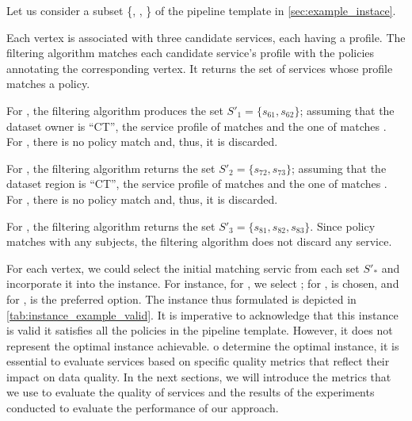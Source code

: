 \begin{example}[\bf \pipelineInstance]\label{ex:instance}

  Let us consider a subset \{, , \} of the pipeline template \tChartFunction in \cref{sec:example_instace}.

  Each vertex is associated with three candidate services, each having a profile. The filtering algorithm matches each candidate service's profile with the policies annotating the corresponding vertex. It returns the set of services whose profile matches a policy.
  \begin{enumerate*}[label=\textit{\roman*})]
    \item For , the filtering algorithm produces the set $S'_1=\{s_{61},s_{62}\}$; assuming that the dataset owner is ``CT'', the service profile of  matches  and the one of  matches .
          For , there is no policy match and, thus, it is discarded.
    \item For , the filtering algorithm returns the set $S'_2=\{s_{72},s_{73}\}$; assuming that the dataset region is ``CT'', the service profile of  matches  and the one of  matches .
          For , there is no policy match and, thus, it is discarded.
    \item For , the filtering algorithm returns the set $S'_3=\{s_{81},s_{82},s_{83}\}$. Since policy  matches with any subjects, the filtering algorithm does not discard any service.
  \end{enumerate*}

  For each vertex, we could select the initial matching servic from each set $S'_*$ and incorporate it into the instance.
  For instance, for , we select ; for ,  is chosen, and for ,  is the preferred option.
  The instance thus formulated is depicted in \cref{tab:instance_example_valid}.
  It is imperative to acknowledge that this instance is valid it satisfies all the policies in the pipeline template.
  However, it does not represent the optimal instance achievable.
  o determine the optimal instance, it is essential to evaluate services based on specific quality metrics that reflect their impact on data quality.
  In the next sections, we will introduce the metrics that we use to evaluate the quality of services and the results of the experiments conducted to evaluate the performance of our approach.





\end{example}

